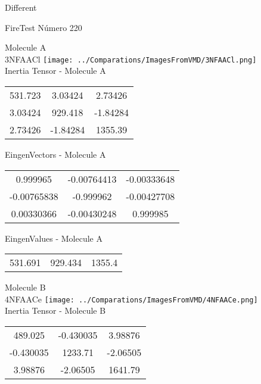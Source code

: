 \begin{center}
\vtab
\vtab
\textcolor{NavyBlue}{\Large Different}
\end{center}

 \newpage

\vtab[-2cm]
\begin{center}
{\large FireTest \tab Número 220}
\end{center}
\begin{multicols}{2}
\begin{center}

Molecule A \\ 
3NFAACl
\texttt{[image: ../Comparations/ImagesFromVMD/3NFAACl.png]}
\\
Inertia Tensor - Molecule A \\
\vtab

\begin{tabular}{|c c c|}
531.723	 & 	3.03424	 & 	2.73426	 \\
3.03424	 & 	929.418	 & 	-1.84284	 \\
2.73426	 & 	-1.84284	 & 	1355.39
\end{tabular}

\vtab
 EingenVectors - Molecule A     \\
\vtab
\begin{tabular}{|c c c|}
0.999965	 & 	-0.00764413	 & 	-0.00333648	 \\
-0.00765838	 & 	-0.999962	 & 	-0.00427708	 \\
0.00330366	 & 	-0.00430248	 & 	0.999985
\end{tabular}

\vtab
 EingenValues - Molecule A     \\
\vtab
\begin{tabular}{|c c c|}
531.691	 & 	929.434	 & 	1355.4	 \\
\end{tabular}
\columnbreak

Molecule B \\ 
4NFAACe
\texttt{[image: ../Comparations/ImagesFromVMD/4NFAACe.png]}
\\
Inertia Tensor - Molecule B \\
\vtab

\begin{tabular}{|c c c|}
489.025	 & 	-0.430035	 & 	3.98876	 \\
-0.430035	 & 	1233.71	 & 	-2.06505	 \\
3.98876	 & 	-2.06505	 & 	1641.79
\end{tabular}


\end{center}
\end{multicols}
